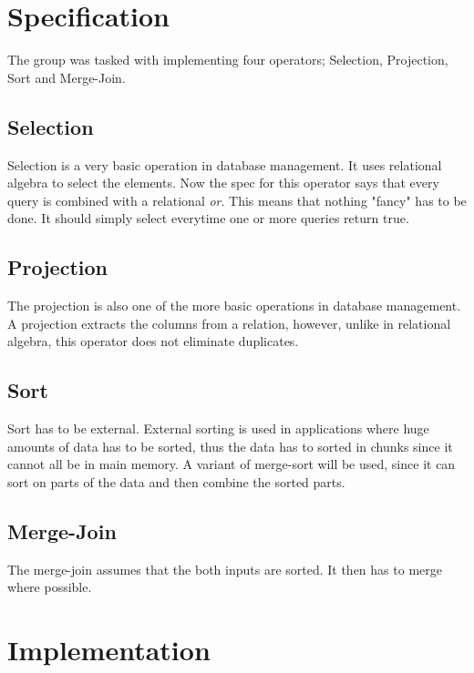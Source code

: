 \documentclass[a4paper,10pt,titlepage]{report}
\begin{document}
\section{Specification}
The group was tasked with implementing four operators; Selection, Projection, Sort and Merge-Join.

\subsection{Selection}
Selection is a very basic operation in database management. It uses relational algebra to select the elements. Now the spec for this operator says that every query is combined with a relational \textit{or}. This means that nothing "fancy" has to be done. It should simply select everytime one or more queries return true.
\subsection{Projection}
The projection is also one of the more basic operations in database management. A projection extracts the columns from a relation, however, unlike in relational algebra, this operator does not eliminate duplicates.
\subsection{Sort}
Sort has to be external. External sorting is used in applications where huge amounts of data has to be sorted, thus the data has to sorted in chunks since it cannot all be in main memory. A variant of merge-sort will be used, since it can sort on parts of the data and then combine the sorted parts.
\subsection{Merge-Join}
The merge-join assumes that the both inputs are sorted. It then has to merge where possible.

%

\section{Implementation}
\end{document}
